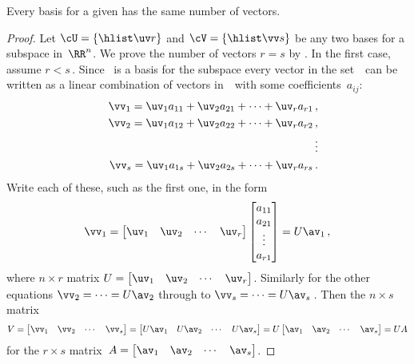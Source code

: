 \begin{theorem} \label{thm:sameDii} 
Every basis for a given  has the same number of vectors.
\end{theorem}
\begin{proof} 
Let \(\cU=\{\hlist\uv r\}\) and \(\cV=\{\hlist\vv s\}\) be any two  bases for a subspace in~\(\RR^n\).
We prove the number of vectors \(r=s\) by .
In the first case, assume \(r<s\)\,.
Since \cU\ is a basis for the subspace every vector in the set~\cV\ can be written as a linear combination of vectors in~\cU\ with some coefficients~\(a_{ij}\):
\begin{eqnarray*}
  &&\vv_1=\uv_1a_{11}+\uv_2a_{21}+\cdots+\uv_ra_{r1}\,,
\\&&\vv_2=\uv_1a_{12}+\uv_2a_{22}+\cdots+\uv_ra_{r2}\,,
\\&&\quad\vdots
\\&&\vv_s=\uv_1a_{1s}+\uv_2a_{2s}+\cdots+\uv_ra_{rs}\,.
\end{eqnarray*}
Write each of these, such as the first one, in the form
\begin{equation*}
\vv_1=\begin{bmatrix} \uv_1&\uv_2&\cdots&\uv_r \end{bmatrix}
\begin{bmatrix} a_{11}\\a_{21}\\\vdots\\a_{r1} \end{bmatrix}
=U\av_1\,,
\end{equation*}
where \(n\times r\) matrix \(U=\begin{bmatrix} \uv_1&\uv_2&\cdots&\uv_r \end{bmatrix}\).
Similarly for the other equations \(\vv_2=\cdots=U\av_2\) through to \(\vv_s=\cdots=U\av_s\)\,.
Then the \(n\times s\) matrix
\begin{equation*}
V=\begin{bmatrix} \vv_1&\vv_2&\cdots&\vv_s \end{bmatrix}
=\begin{bmatrix} U\av_1& U\av_2&\cdots&U\av_s\end{bmatrix}
=U\begin{bmatrix} \av_1& \av_2&\cdots&\av_s\end{bmatrix}
=UA
\end{equation*}
for the \(r\times s\) matrix~\(A=\begin{bmatrix} \av_1& \av_2&\cdots&\av_s \end{bmatrix}\).

\end{proof}
